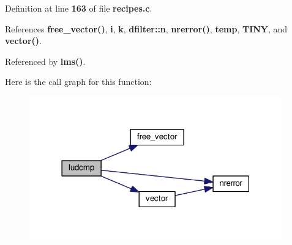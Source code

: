 Definition at line {\bf 163} of file {\bf recipes.\+c}.



References {\bf free\+\_\+vector()}, {\bf i}, {\bf k}, {\bf dfilter\+::n}, {\bf nrerror()}, {\bf temp}, {\bf T\+I\+NY}, and {\bf vector()}.



Referenced by {\bf lms()}.



Here is the call graph for this function\+:
\nopagebreak
\begin{figure}[H]
\begin{center}
\leavevmode
\includegraphics[width=309pt]{db/de5/recipes_8c_a623fec796d9d53e5e4a4d30226547da7_cgraph}
\end{center}
\end{figure}




